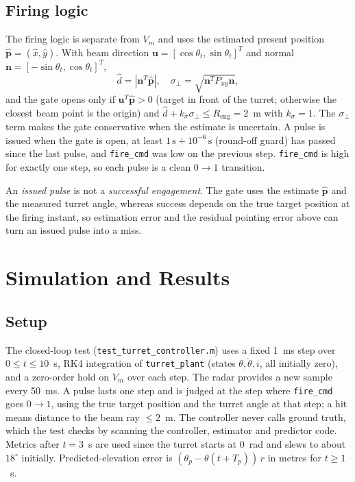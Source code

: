 \documentclass[conference]{IEEEtran}
\newcommand{\Tp}{T_p}
\newcommand{\vect}[1]{\mathbf{#1}}
\begin{document}
\subsection{Firing logic}

The firing logic is separate from $V_m$ and uses the estimated present position $\hat{\vect p}=(\hat x,\hat y)$. With beam direction $\vect u=[\cos\theta_t,\sin\theta_t]^T$ and normal $\vect n=[-\sin\theta_t,\cos\theta_t]^T$,
\begin{equation}
\hat d=|\vect n^T\hat{\vect p}|,\quad
\sigma_\perp=\sqrt{\vect n^TP_{xy}\vect n},
\end{equation}
and the gate opens only if $\vect u^T\hat{\vect p}>0$ (target in front of the turret; otherwise the closest beam point is the origin) and $\hat d+k_\sigma\sigma_\perp\le R_\mathrm{eng}=2$~m with $k_\sigma=1$. The $\sigma_\perp$ term makes the gate conservative when the estimate is uncertain. A pulse is issued when the gate is open, at least $1\,\mathrm{s}+10^{-6}\,\mathrm{s}$ (round-off guard) has passed since the last pulse, and \texttt{fire\_cmd} was low on the previous step. \texttt{fire\_cmd} is high for exactly one step, so each pulse is a clean $0\to1$ transition.

An \emph{issued pulse} is not a \emph{successful engagement}. The gate uses the estimate $\hat{\vect p}$ and the measured turret angle, whereas success depends on the true target position at the firing instant, so estimation error and the residual pointing error above can turn an issued pulse into a miss.

\section{Simulation and Results}

\subsection{Setup}

The closed-loop test (\texttt{test\_turret\_controller.m}) uses a fixed 1~ms step over $0\le t\le10$~s, RK4 integration of \texttt{turret\_plant} (states $\theta,\dot\theta,i$, all initially zero), and a zero-order hold on $V_m$ over each step. The radar provides a new sample every 50~ms. A pulse lasts one step and is judged at the step where \texttt{fire\_cmd} goes $0\to1$, using the true target position and the turret angle at that step; a hit means distance to the beam ray $\le2$~m. The controller never calls ground truth, which the test checks by scanning the controller, estimator and predictor code. Metrics after $t=3$~s are used since the turret starts at $0$~rad and slews to about $18^\circ$ initially. Predicted-elevation error is $(\theta_p-\theta(t{+}\Tp))\,r$ in metres for $t\ge1$~s.
\end{document}
